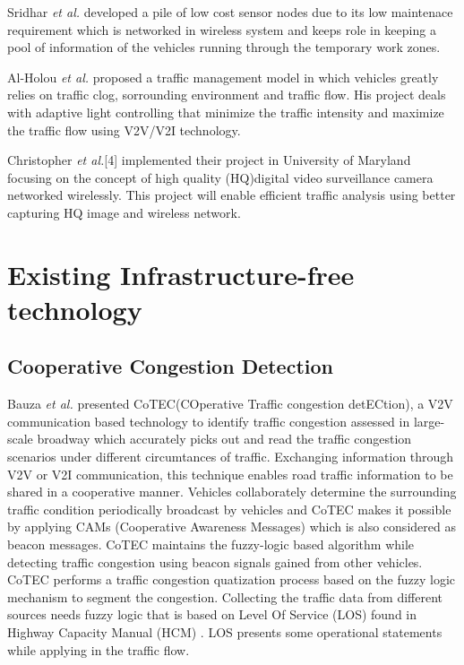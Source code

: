 \documentclass[conference]{IEEEtran}
\begin{document}
Sridhar \textit{et al.}\cite{gnawali2009collection} developed a pile of low cost sensor nodes due to its low maintenace requirement which is networked in wireless system and keeps role in keeping a pool of information of the vehicles running through the temporary work zones.

Al-Holou \textit{et al.} \cite{nellore2016survey} proposed a traffic management model in which vehicles greatly relies on traffic clog, sorrounding environment and traffic flow. His project deals with adaptive light controlling that minimize the traffic intensity and maximize the traffic flow using V2V/V2I technology. 

Christopher \textit{et al.}[4] implemented their project in University of Maryland focusing on the concept of high quality (HQ)digital video surveillance camera networked wirelessly. This project will enable efficient traffic analysis using better capturing HQ image and wireless network.

\section{Existing Infrastructure-free technology}
\subsection{Cooperative Congestion Detection}

Bauza \textit{et al.}\cite{bauza2013traffic} presented CoTEC(COperative Traffic congestion detECtion), a V2V communication based technology to identify traffic congestion assessed in large-scale broadway which accurately picks out and read the traffic congestion scenarios under different circumtances of traffic. Exchanging information through V2V or V2I communication, this technique enables road traffic information to be shared in a cooperative manner. Vehicles collaborately determine the surrounding traffic condition periodically broadcast by vehicles and CoTEC makes it possible by applying CAMs (Cooperative Awareness Messages) which is also considered as beacon messages. CoTEC maintains the fuzzy-logic based algorithm while detecting traffic congestion using beacon signals gained from other vehicles. CoTEC performs a traffic congestion quatization process based on the fuzzy logic mechanism to segment the congestion. Collecting the traffic data from different sources needs fuzzy logic that is based on Level Of Service (LOS) found in Highway Capacity Manual (HCM) \cite{araujo2014cartim}. LOS presents some operational statements while applying in the traffic flow. 
\end{document}
